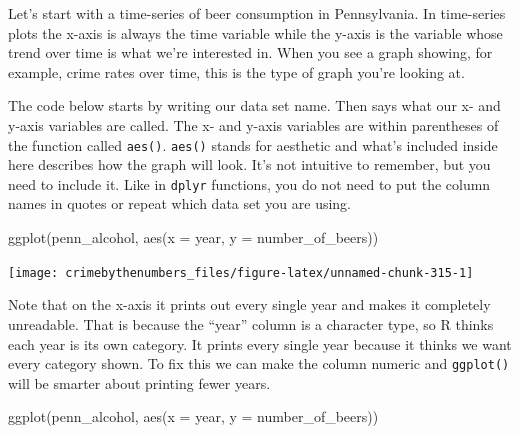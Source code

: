 \documentclass[
]{krantz}
\makeatletter
\newenvironment{Shaded}{\begin{snugshade}}{\end{snugshade}}
\newcommand{\AttributeTok}[1]{\textcolor[rgb]{0.61,0.61,0.61}{#1}}
\newcommand{\FunctionTok}[1]{\textcolor[rgb]{0,0,0}{#1}}
\newcommand{\NormalTok}[1]{#1}
\newcommand{\OtherTok}[1]{\textcolor[rgb]{0.37,0.37,0.37}{#1}}
\newcommand{\SpecialCharTok}[1]{\textcolor[rgb]{0,0,0}{#1}}
\newenvironment{kframe}{%
\medskip{}
\setlength{\fboxsep}{.8em}
 \def\at@end@of@kframe{}%
 \ifinner\ifhmode%
  \def\at@end@of@kframe{\end{minipage}}%
  \begin{minipage}{\columnwidth}%
 \fi\fi%
 \def\FrameCommand##1{\hskip\@totalleftmargin \hskip-\fboxsep
 \colorbox{shadecolor}{##1}\hskip-\fboxsep
     \hskip-\linewidth \hskip-\@totalleftmargin \hskip\columnwidth}%
 \MakeFramed {\advance\hsize-\width
   \@totalleftmargin\z@ \linewidth\hsize
   \@setminipage}}%
 {\par\unskip\endMakeFramed%
 \at@end@of@kframe}
\renewenvironment{Shaded}{\begin{kframe}}{\end{kframe}}
\makeatother
\begin{document}
Let's start with a time-series of beer consumption in Pennsylvania. In time-series plots the x-axis is always the time variable while the y-axis is the variable whose trend over time is what we're interested in. When you see a graph showing, for example, crime rates over time, this is the type of graph you're looking at.

The code below starts by writing our data set name. Then says what our x- and y-axis variables are called. The x- and y-axis variables are within parentheses of the function called \texttt{aes()}. \texttt{aes()} stands for aesthetic and what's included inside here describes how the graph will look. It's not intuitive to remember, but you need to include it. Like in \texttt{dplyr} functions, you do not need to put the column names in quotes or repeat which data set you are using.

\begin{Shaded}
\begin{Highlighting}[]
\FunctionTok{ggplot}\NormalTok{(penn\_alcohol, }\FunctionTok{aes}\NormalTok{(}\AttributeTok{x =}\NormalTok{ year,}
                         \AttributeTok{y =}\NormalTok{ number\_of\_beers))}
\end{Highlighting}
\end{Shaded}

\begin{center}\texttt{[image: crimebythenumbers\_files/figure-latex/unnamed-chunk-315-1]} \end{center}

Note that on the x-axis it prints out every single year and makes it completely unreadable. That is because the ``year'' column is a character type, so R thinks each year is its own category. It prints every single year because it thinks we want every category shown. To fix this we can make the column numeric and \texttt{ggplot()} will be smarter about printing fewer years.

\begin{Shaded}
\end{Shaded}

\begin{Shaded}
\begin{Highlighting}[]
\FunctionTok{ggplot}\NormalTok{(penn\_alcohol, }\FunctionTok{aes}\NormalTok{(}\AttributeTok{x =}\NormalTok{ year,}
                         \AttributeTok{y =}\NormalTok{ number\_of\_beers))}
\end{Highlighting}
\end{Shaded}
\end{document}
